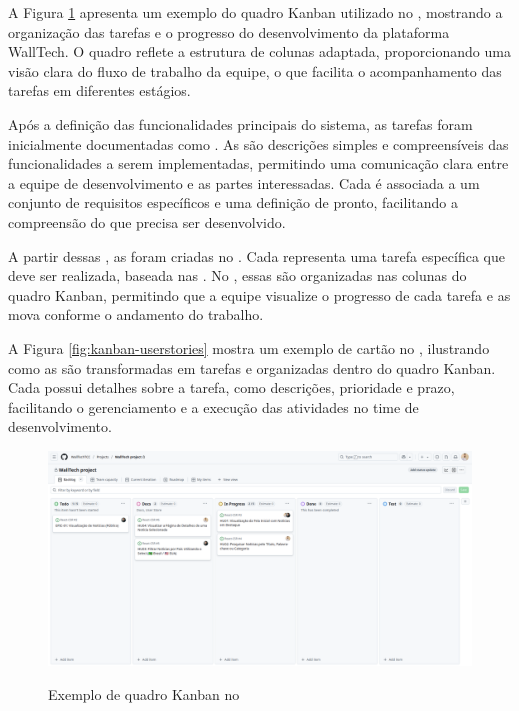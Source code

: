 A Figura \ref{fig:kanban-walltech} apresenta um exemplo do quadro Kanban utilizado no , mostrando a organização das tarefas e o progresso do desenvolvimento da plataforma WallTech. O quadro reflete a estrutura de colunas adaptada, proporcionando uma visão clara do fluxo de trabalho da equipe, o que facilita o acompanhamento das tarefas em diferentes estágios.

Após a definição das funcionalidades principais do sistema, as tarefas foram inicialmente documentadas como . As  são descrições simples e compreensíveis das funcionalidades a serem implementadas, permitindo uma comunicação clara entre a equipe de desenvolvimento e as partes interessadas. Cada  é associada a um conjunto de requisitos específicos e uma definição de pronto, facilitando a compreensão do que precisa ser desenvolvido.

A partir dessas , as  foram criadas no . Cada  representa uma tarefa específica que deve ser realizada, baseada nas . No , essas  são organizadas nas colunas do quadro Kanban, permitindo que a equipe visualize o progresso de cada tarefa e as mova conforme o andamento do trabalho.

A Figura \ref{fig:kanban-userstories} mostra um exemplo de cartão  no , ilustrando como as  são transformadas em tarefas e organizadas dentro do quadro Kanban. Cada  possui detalhes sobre a tarefa, como descrições, prioridade e prazo, facilitando o gerenciamento e a execução das atividades no time de desenvolvimento.

\begin{figure}[H]
  \centering
  \caption{Exemplo de quadro Kanban no }
  \includegraphics[width=1.0\textwidth]{media/wall_tech_kanban.png}
  \label{fig:kanban-walltech}
\end{figure}

